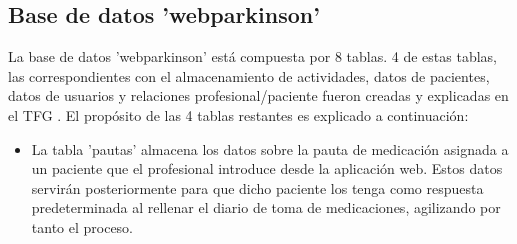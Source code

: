 \subsection{Base de datos 'webparkinson'}
La base de datos 'webparkinson' está compuesta por 8 tablas. 4 de estas tablas, las correspondientes con el almacenamiento de actividades, datos de pacientes, datos de usuarios y relaciones profesional/paciente fueron creadas y explicadas en el TFG \cite{Martos2024}. El propósito de las 4 tablas restantes es explicado a continuación:
\begin{itemize}
    \item La tabla 'pautas' almacena los datos sobre la pauta de medicación asignada a un paciente que el profesional introduce desde la aplicación web. Estos datos servirán posteriormente para que dicho paciente los tenga como respuesta predeterminada al rellenar el diario de toma de medicaciones, agilizando por tanto el proceso. 


\end{itemize}
